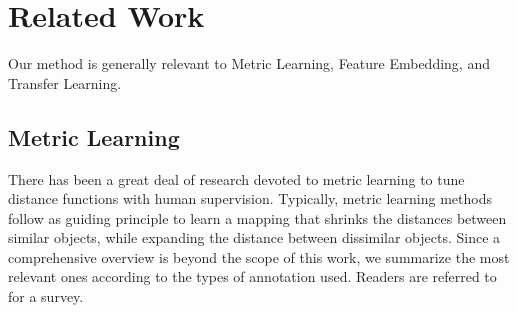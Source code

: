 


\section{Related Work}
\label{mi:sec:rel}

Our method is generally relevant to Metric Learning, Feature
Embedding, and Transfer Learning.

\subsection{Metric Learning}
There has been a great deal of research devoted to metric learning
to tune distance functions  with human supervision. %
Typically, metric learning methods 
follow as guiding principle to learn a mapping that shrinks the
distances between similar objects, while expanding the distance between 
dissimilar objects. 
Since a comprehensive overview is beyond the scope of this work, we
summarize the most relevant ones according to the types of annotation
used. Readers are referred to~\citep{metric:survey:12}
for a survey.

